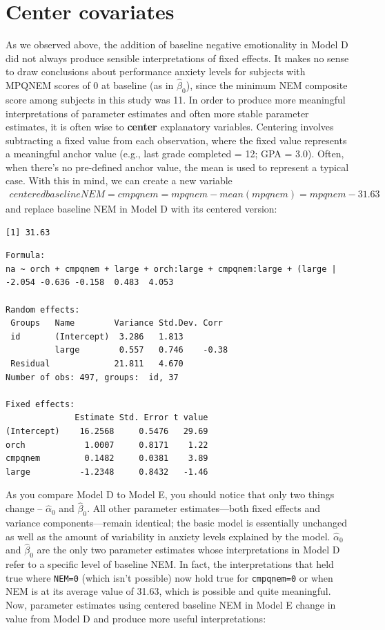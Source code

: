 \documentclass[
]{krantz}
\begin{document}
\hypertarget{sec:modele}{%
\section{Center covariates}\label{sec:modele}}

As we observed above, the addition of baseline negative emotionality in Model D did not always produce sensible interpretations of fixed effects. It makes no sense to draw conclusions about performance anxiety levels for subjects with MPQNEM scores of 0 at baseline (as in \(\hat{\beta}_{0}\)), since the minimum NEM composite score among subjects in this study was 11. In order to produce more meaningful interpretations of parameter estimates and often more stable parameter estimates, it is often wise to \textbf{center} explanatory variables. Centering involves subtracting a fixed value from each observation, where the fixed value represents a meaningful anchor value (e.g., last grade completed = 12; GPA = 3.0). Often, when there's no pre-defined anchor value, the mean is used to represent a typical case. With this in mind, we can create a new variable
\begin{align*}
\textstyle{centeredbaselineNEM} = \textstyle{cmpqnem} = \textstyle{mpqnem - mean(mpqnem)} = \textstyle{mpqnem} - 31.63
\end{align*}
and replace baseline NEM in Model D with its centered version:

\begin{verbatim}
[1] 31.63
\end{verbatim}

\begin{verbatim}
Formula: 
na ~ orch + cmpqnem + large + orch:large + cmpqnem:large + (large |  
-2.054 -0.636 -0.158  0.483  4.053 

Random effects:
 Groups   Name        Variance Std.Dev. Corr 
 id       (Intercept)  3.286   1.813         
          large        0.557   0.746    -0.38
 Residual             21.811   4.670         
Number of obs: 497, groups:  id, 37

Fixed effects:
              Estimate Std. Error t value
(Intercept)    16.2568     0.5476   29.69
orch            1.0007     0.8171    1.22
cmpqnem         0.1482     0.0381    3.89
large          -1.2348     0.8432   -1.46
\end{verbatim}

As you compare Model D to Model E, you should notice that only two things change -- \(\hat{\alpha}_{0}\) and \(\hat{\beta}_{0}\). All other parameter estimates---both fixed effects and variance components---remain identical; the basic model is essentially unchanged as well as the amount of variability in anxiety levels explained by the model. \(\hat{\alpha}_{0}\) and \(\hat{\beta}_{0}\) are the only two parameter estimates whose interpretations in Model D refer to a specific level of baseline NEM. In fact, the interpretations that held true where \texttt{NEM=0} (which isn't possible) now hold true for \texttt{cmpqnem=0} or when NEM is at its average value of 31.63, which is possible and quite meaningful. Now, parameter estimates using centered baseline NEM in Model E change in value from Model D and produce more useful interpretations:
\end{document}
